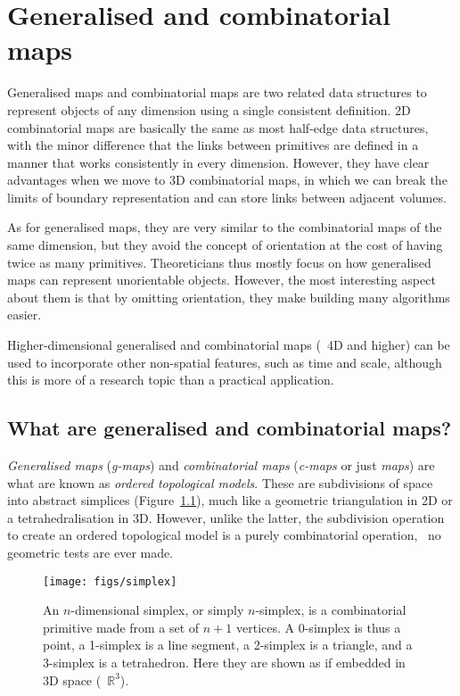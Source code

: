 
\setchapterpreamble[u]{\margintoc}

\graphicspath{{gmaps/}}
\renewcommand*{\thelesson}{5.1}

\chapter{Generalised and combinatorial maps}%
\label{chap:gmaps}

Generalised maps and combinatorial maps are two related data structures to represent objects of any dimension using a single consistent definition.
2D combinatorial maps are basically the same as most half-edge data structures, with the minor difference that the links between primitives are defined in a manner that works consistently in every dimension.
However, they have clear advantages when we move to 3D combinatorial maps, in which we can break the limits of boundary representation and can store links between adjacent volumes.

As for generalised maps, they are very similar to the combinatorial maps of the same dimension, but they avoid the concept of orientation at the cost of having twice as many primitives.
Theoreticians thus mostly focus on how generalised maps can represent unorientable objects.
However, the most interesting aspect about them is that by omitting orientation, they make building many algorithms easier.

Higher-dimensional generalised and combinatorial maps (\ie\ 4D and higher) can be used to incorporate other non-spatial features, such as time and scale, although this is more of a research topic than a practical application.

\section{What are generalised and combinatorial maps?}

\emph{Generalised maps} (\emph{g-maps}) and \emph{combinatorial maps} (\emph{c-maps} or just \emph{maps}) are what are known as \emph{ordered topological models}.
These are subdivisions of space into abstract simplices (Figure~\ref{fig:simplices}), much like a geometric triangulation in 2D or a tetrahedralisation in 3D.
However, unlike the latter, the subdivision operation to create an ordered topological model is a purely combinatorial operation, \ie\ no geometric tests are ever made.

\begin{figure}
\centering
\texttt{[image: figs/simplex]}
\caption{An \(n\)-dimensional simplex, or simply \(n\)-simplex, is a combinatorial primitive made from a set of \(n+1\) vertices.
A 0-simplex is thus a point, a 1-simplex is a line segment, a 2-simplex is a triangle, and a 3-simplex is a tetrahedron.
Here they are shown as if embedded in 3D space (\ie\ \(\mathbb{R}^3\)).}%
\label{fig:simplices}
\end{figure}

